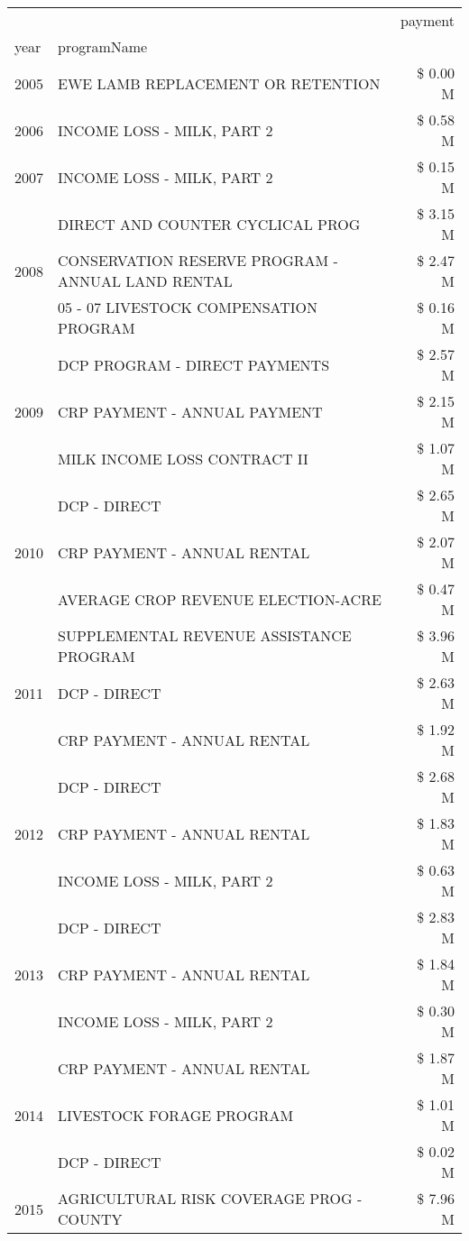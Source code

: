 \begin{tabular}{llr}
\toprule
 &  & payment \\
year & programName &  \\
\midrule
2005 & EWE LAMB REPLACEMENT OR RETENTION & \$ 0.00 M \\
\cline{1-3}
2006 & INCOME LOSS - MILK, PART 2 & \$ 0.58 M \\
\cline{1-3}
2007 & INCOME LOSS - MILK, PART 2 & \$ 0.15 M \\
\cline{1-3}
\multirow[t]{3}{*}{2008} & DIRECT AND COUNTER CYCLICAL PROG & \$ 3.15 M \\
 & CONSERVATION RESERVE PROGRAM - ANNUAL LAND RENTAL & \$ 2.47 M \\
 & 05 - 07 LIVESTOCK COMPENSATION PROGRAM & \$ 0.16 M \\
\cline{1-3}
\multirow[t]{3}{*}{2009} & DCP PROGRAM - DIRECT PAYMENTS & \$ 2.57 M \\
 & CRP PAYMENT - ANNUAL PAYMENT & \$ 2.15 M \\
 & MILK INCOME LOSS CONTRACT II & \$ 1.07 M \\
\cline{1-3}
\multirow[t]{3}{*}{2010} & DCP - DIRECT & \$ 2.65 M \\
 & CRP PAYMENT - ANNUAL RENTAL & \$ 2.07 M \\
 & AVERAGE CROP REVENUE ELECTION-ACRE & \$ 0.47 M \\
\cline{1-3}
\multirow[t]{3}{*}{2011} & SUPPLEMENTAL REVENUE ASSISTANCE PROGRAM & \$ 3.96 M \\
 & DCP - DIRECT & \$ 2.63 M \\
 & CRP PAYMENT - ANNUAL RENTAL & \$ 1.92 M \\
\cline{1-3}
\multirow[t]{3}{*}{2012} & DCP - DIRECT & \$ 2.68 M \\
 & CRP PAYMENT - ANNUAL RENTAL & \$ 1.83 M \\
 & INCOME LOSS - MILK, PART 2 & \$ 0.63 M \\
\cline{1-3}
\multirow[t]{3}{*}{2013} & DCP - DIRECT & \$ 2.83 M \\
 & CRP PAYMENT - ANNUAL RENTAL & \$ 1.84 M \\
 & INCOME LOSS - MILK, PART 2 & \$ 0.30 M \\
\cline{1-3}
\multirow[t]{3}{*}{2014} & CRP PAYMENT - ANNUAL RENTAL & \$ 1.87 M \\
 & LIVESTOCK FORAGE PROGRAM & \$ 1.01 M \\
 & DCP - DIRECT & \$ 0.02 M \\
\cline{1-3}
\multirow[t]{3}{*}{2015} & AGRICULTURAL RISK COVERAGE PROG - COUNTY & \$ 7.96 M \\

\end{tabular}
